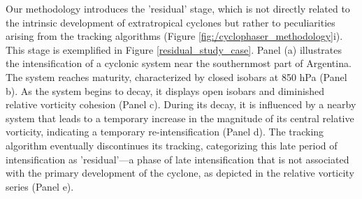 Our methodology introduces the 'residual' stage, which is not directly related to the intrinsic development of extratropical cyclones but rather to peculiarities arising from the tracking algorithms (Figure \ref{fig:/cyclophaser_methodology}i). This stage is exemplified in Figure \ref{residual_study_case}. Panel (a) illustrates the intensification of a cyclonic system near the southernmost part of Argentina. The system reaches maturity, characterized by closed isobars at 850 hPa (Panel b). As the system begins to decay, it displays open isobars and diminished relative vorticity cohesion (Panel c). During its decay, it is influenced by a nearby system that leads to a temporary increase in the magnitude of its central relative vorticity, indicating a temporary re-intensification (Panel d). The tracking algorithm eventually discontinues its tracking, categorizing this late period of intensification as 'residual'—a phase of late intensification that is not associated with the primary development of the cyclone, as depicted in the relative vorticity series (Panel e).

